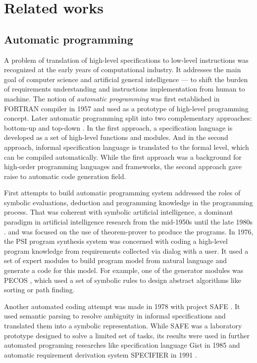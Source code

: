 \chapter{Related works}
\label{Chapter2}

\section{Automatic programming}
A problem of translation of high-level specifications to low-level instructions was recognized at the early years of computational industry. It addresses the main goal of computer science and artificial general intelligence --- to shift the burden of requirements understanding and instructions implementation from human to machine. The notion of \emph{automatic programming} was first established in FORTRAN compiler in 1957 \parencite{backus1957fortran} and used as a prototype of high-level programming concept.  Later automatic programming split into two complementary approaches: bottom-up and top-down \parencite{Balzer1985}. In the first approach, a specification language is developed as a set of high-level functions and modules. And in the second approach, informal specification language is translated to the formal level, which can be compiled automatically. While the first approach was a background for high-order programming languages and frameworks, the second approach gave raise to automatic code generation field. 

First attempts to build automatic programming system addressed the roles of symbolic evaluations, deduction and programming knowledge in the programming process. That was coherent with symbolic artificial intelligence, a dominant paradigm in artificial intelligence research from the mid-1950s until the late 1980s \parencite{haugeland1989artificial}. \cite{green1969application} and \cite{Lee1974} was focused on the use of theorem-prover to produce the programs. In 1976, the PSI program synthesis system \parencite{green1976design, green1977summary} was concerned with coding a high-level program knowledge from requirements collected via dialog with a user. It used a set of expert modules to build program model from natural language and generate a code for this model. For example, one of the generator modules was PECOS \parencite{barstow1979experiment}, which used a set of symbolic rules to design abstract algorithms like sorting or path finding. 

Another automated coding attempt was made in 1978 with project SAFE \parencite{balzer1978informality}. It used semantic parsing to resolve ambiguity in informal specifications and translated them into a symbolic representation. While SAFE was a laboratory prototype designed to solve a limited set of tasks, its results were used in further automated programing researches like specification language Gist \parencite{Balzer1985} in 1985 and automatic requirement derivation system SPECIFIER in 1991 \parencite{Miriyala1991}.

